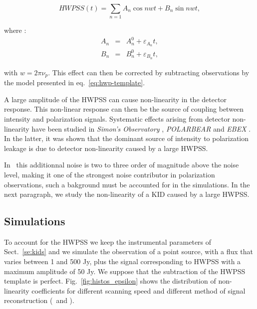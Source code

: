 \begin{equation}
HWPSS(t) = \sum_{n=1} A_{n} \cos nwt + B_{n} \sin nwt , 
\label{eq:hwp-template}
\end{equation}

where : 
\begin{eqnarray}
A_{n}  &=& A_{n}^{0} + \varepsilon_{A_{n}}t,\\
B_{n}  &=& B_{n}^{0} + \varepsilon_{B_{n}}t, 
\end{eqnarray}

with $w = 2 \pi \nu_{p}$.
This effect can then be corrected by subtracting observations by the model presented in eq.~\ref{eq:hwp-template}. 

A large amplitude of the HWPSS can cause non-linearity in the detector response. This non-linear response can then be the source of coupling between intensity and polarization signals. Systematic effects arising from detector non-linearity have been studied in \emph{Simon's Observatory} \citep{2018SPIE10708E..48S}, \emph{POLARBEAR} \citep{2017JCAP...05..008T} and \emph{EBEX} \citep{2017arXiv171101314D}. In the latter, it was shown that the dominant source of intensity to polarization leakage is due to detector non-linearity caused by a large HWPSS. 

In \nikad\ this additionnal noise is two to three order of magnitude above the noise level, making it one of the strongest noise contributor in polarization observations, such a bakground must be accounted for in the simulations. In the next paragraph, we study the non-linearity of a KID caused by a large HWPSS. 


\subsection{Simulations}

To account for the HWPSS we keep the instrumental parameters of Sect.~\ref{se:kids} and we simulate the observation of a point source, with a flux that varies between 1 and 500 Jy, plus the signal corresponding to HWPSS with a maximum amplitude of 50 Jy. We suppose that the subtraction of the HWPSS template is perfect. Fig.~\ref{fig:histos_epsilon} shows the distribution of non-linearity coefficients for different scanning speed and different method of signal reconstruction (\rf\ and \cf). 

